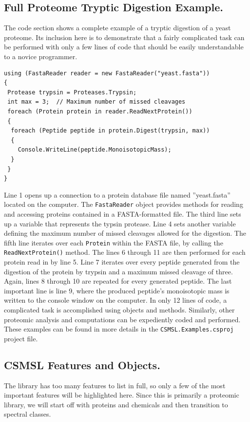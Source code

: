 \subsection*{Full Proteome Tryptic Digestion Example.} The code section shows a complete example of a tryptic digestion of a yeast proteome. Its inclusion here is to demonstrate that a fairly complicated task can be performed with only a few lines of code that should be easily understandable to a novice programmer.
\begin{lstlisting}
using (FastaReader reader = new FastaReader("yeast.fasta"))
{
 Protease trypsin = Proteases.Trypsin;
 int max = 3;  // Maximum number of missed cleavages
 foreach (Protein protein in reader.ReadNextProtein())
 {
  foreach (Peptide peptide in protein.Digest(trypsin, max))
  {
    Console.WriteLine(peptide.MonoisotopicMass);  
  }
 }
}       
\end{lstlisting}
Line 1 opens up a connection to a protein database file named ''yeast.fasta'' located on the computer. The \texttt{FastaReader} object provides methods for reading and accessing proteins contained in a FASTA-formatted file. The third line sets up a variable that represents the typsin protease. Line 4 sets another variable defining the maximum number of missed cleavages allowed for the digestion. The fifth line iterates over each \texttt{Protein} within the FASTA file, by calling the \texttt{ReadNextProtein()} method. The lines 6 through 11 are then performed for each protein read in by line 5. Line 7 iterates over every peptide generated from the digestion of the protein by trypsin and a maximum missed cleavage of three. Again, lines 8 through 10 are repeated for every generated peptide. The last important line is line 9, where the produced peptide's monoisotopic mass is written to the console window on the computer. In only 12 lines of code, a complicated task is accomplished using \csmsl{} objects and methods. Similarly, other proteomic analysis and computations can be expediently coded and performed. These examples can be found in more details in the \texttt{CSMSL.Examples.csproj} project file.

\subsection*{CSMSL Features and Objects.}
The \csmsl{} library has too many features to list in full, so only a few of the most important features will be highlighted here. Since this is primarily a proteomic library, we will start off with proteins and chemicals and then transition to spectral classes. 

